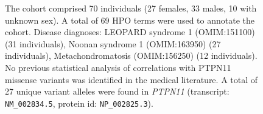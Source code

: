 \begin{figure}[htbp]
\vspace{2em}

\caption{The cohort comprised 70 individuals (27 females, 33 males, 10 with unknown sex). A total of 69 HPO terms were used to annotate the cohort. Disease diagnoses: LEOPARD syndrome 1 (OMIM:151100) (31 individuals), Noonan syndrome 1 (OMIM:163950) (27 individuals), Metachondromatosis (OMIM:156250) (12 individuals). No previous statistical analysis of correlations with PTPN11 missense variants was identified in the medical literature. A total of 27 unique variant alleles were found in \textit{PTPN11} (transcript: \texttt{NM\_002834.5}, protein id: \texttt{NP\_002825.3}).}
\end{figure}
